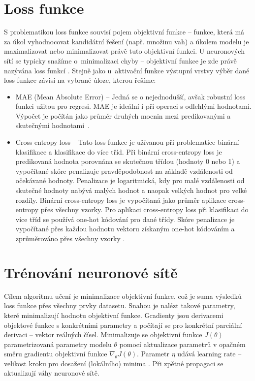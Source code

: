 \section{Loss funkce}
\label{section:loss}
S problematikou loss funkce souvisí pojem objektivní funkce -- funkce, která má za úkol vyhodnocovat kandidátní řešení (např. množinu vah) a úkolem modelu je maximalizovat nebo minimalizovat právě tuto objektivní funkci. U neuronových sítí se typicky snažíme o~minimalizaci chyby -- objektivní funkce je zde právě nazývána loss funkcí \cite{LossFunctions}. Stejně jako u~aktivační funkce výstupní vrstvy výběr dané loss funkce závisí na vybrané úloze, kterou řešíme:
\begin{itemize}
    \item MAE (Mean Absolute Error) -- Jedná se o nejednodušší, avšak robustní loss funkci užitou pro regresi. MAE je ideální i při operaci s odlehlými hodnotami. Výpočet je počítán jako průměr druhých mocnin mezi predikovanými a skutečnými hodnotami~\cite{LossFunctions}.
    \item Cross-entropy loss -- Tato loss funkce je užívanou při problematice binární klasifikace a klasifikace do více tříd. Při binární cross-entropy loss je predikovaná hodnota porovnána se skutečnou třídou (hodnoty 0 nebo 1) a vypočítané skóre penalizuje pravděpodobnost na základě vzdálenosti od očekávané hodnoty. Penalizace je logaritmická, kdy pro malé vzdálenosti od skutečné hodnoty nabývá malých hodnot a naopak velkých hodnot pro velké rozdíly. Binární cross-entropy loss je vypočítaná jako průměr aplikace cross-entropy přes všechny vzorky. Pro aplikaci cross-entropy loss při klasifikaci do více tříd se používá one-hot kódování pro dané třídy. Skóre penalizace je vypočítané přes každou hodnotu vektoru získaným one-hot kódováním a zprůměrováno přes všechny vzorky \cite{LossFunctions}.
\end{itemize}
\section{Trénování neuronové sítě}
\label{section:trenovani}
Cílem algoritmu učení je minimalizace objektivní funkce, což je suma výsledků loss funkce přes všechny prvky datasetu. Snahou je nalézt takové parametry, které minimalizují hodnotu objektivní funkce. Gradienty jsou derivacemi objektové funkce s konkrétními parametry a počítají se pro konkrétní parciální derivaci -- vektor reálných čísel. Minimalizuje se objektivní funkce $J(\theta)$ parametrizovaná parametry modelu $\theta$ pomocí aktualizace parametrů v opačném směru gradientu objektivní funkce $\nabla_{\theta}J(\theta)$. Parametr $\eta$ udává learning rate -- velikost kroku pro dosažení (lokálního) minima \cite{GradientDescent}. Při zpětné propagaci se aktualizují váhy neuronové sítě.

